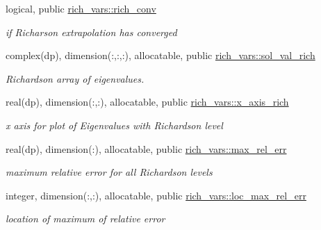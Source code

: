 \begin{DoxyCompactItemize}
logical, public \hyperlink{namespacerich__vars_adf63efd509bbcda4f77fd7e88c766081}{rich\+\_\+vars\+::rich\+\_\+conv}
\begin{DoxyCompactList}\small\item\em if Richarson extrapolation has converged \end{DoxyCompactList}\item 
complex(dp), dimension(\+:,\+:,\+:), allocatable, public \hyperlink{namespacerich__vars_ae1d3c7deb4c8becd036a63367fca5e20}{rich\+\_\+vars\+::sol\+\_\+val\+\_\+rich}
\begin{DoxyCompactList}\small\item\em Richardson array of eigenvalues. \end{DoxyCompactList}\item 
real(dp), dimension(\+:,\+:), allocatable, public \hyperlink{namespacerich__vars_a7f584d9b84f3e3e230b45ce4b8e0e9b1}{rich\+\_\+vars\+::x\+\_\+axis\+\_\+rich}
\begin{DoxyCompactList}\small\item\em x axis for plot of Eigenvalues with Richardson level \end{DoxyCompactList}\item 
real(dp), dimension(\+:), allocatable, public \hyperlink{namespacerich__vars_afac4d06d60829484cfb7d4964964945b}{rich\+\_\+vars\+::max\+\_\+rel\+\_\+err}
\begin{DoxyCompactList}\small\item\em maximum relative error for all Richardson levels \end{DoxyCompactList}\item 
integer, dimension(\+:,\+:), allocatable, public \hyperlink{namespacerich__vars_af3df7361e33058bc83fe43a803173d89}{rich\+\_\+vars\+::loc\+\_\+max\+\_\+rel\+\_\+err}
\begin{DoxyCompactList}\small\item\em location of maximum of relative error \end{DoxyCompactList}\end{DoxyCompactItemize}
